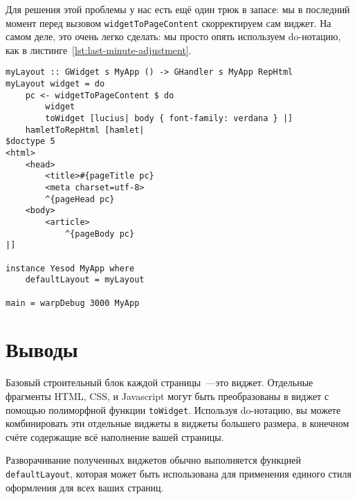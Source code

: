 Для решения этой проблемы у нас есть ещё один трюк в запасе: мы в последний момент перед вызовом \lstinline'widgetToPageContent' скорректируем сам виджет. На самом деле, это очень легко сделать: мы просто опять используем do-нотацию, как в листинге~\ref{lst:last-minute-adjustment}.

\begin{lstlisting}[caption={Корректировка виджета <<в последний момент>>},label={lst:last-minute-adjustment}]
myLayout :: GWidget s MyApp () -> GHandler s MyApp RepHtml
myLayout widget = do
    pc <- widgetToPageContent $ do
        widget
        toWidget [lucius| body { font-family: verdana } |]
    hamletToRepHtml [hamlet|
$doctype 5
<html>
    <head>
        <title>#{pageTitle pc}
        <meta charset=utf-8>
        ^{pageHead pc}
    <body>
        <article>
            ^{pageBody pc}
|]

instance Yesod MyApp where
    defaultLayout = myLayout

main = warpDebug 3000 MyApp
\end{lstlisting}

\section{Выводы}

Базовый строительный блок каждой страницы~---это виджет. Отдельные фрагменты HTML, CSS, и Javascript могут быть преобразованы в виджет с помощью полиморфной функции \lstinline'toWidget'. Используя do-нотацию, вы можете комбинировать эти отдельные виджеты в виджеты большего размера, в конечном счёте содержащие всё наполнение вашей страницы.

Разворачивание полученных виджетов обычно выполняется функцией \lstinline'defaultLayout', которая может быть использована для применения единого стиля оформления для всех ваших страниц.
